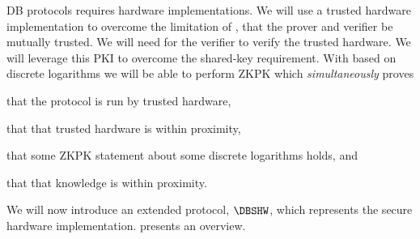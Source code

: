 \Acl{DB} protocols requires hardware implementations.
We will use a trusted hardware implementation to overcome the limitation of 
\textcite{UWBPR}, \ie that the prover and verifier be mutually trusted.
We will need  for the verifier to verify the trusted hardware.
We will leverage this \ac{PKI} to overcome the shared-key requirement.
With  based on discrete logarithms we will be able to perform  
\ac{ZKPK} which \emph{simultaneously} proves
\begin{enumerate*}
\item that the protocol is run by trusted hardware,
\item that that trusted hardware is within proximity,
\item that some \ac{ZKPK} statement about some discrete logarithms holds, and
\item that that knowledge is within proximity.
\end{enumerate*}

We will now introduce an extended protocol, \(\DBSHW\), which represents the 
secure hardware implementation.
 presents an overview.

